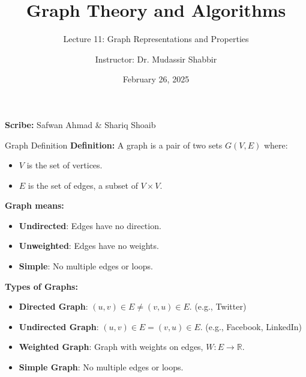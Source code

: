 \documentclass{beamer}
\title{Graph Theory and Algorithms}
\subtitle{Lecture 11: Graph Representations and Properties}
\author{Instructor: Dr. Mudassir Shabbir}
\institute{ITU}
\date{February 26, 2025}
\begin{document}
\begin{frame}
    \titlepage
    \vspace{1cm}
    \textbf{Scribe:} Safwan Ahmad \& Shariq Shoaib
\end{frame}

\begin{frame}{Graph Definition}
    \textbf{Definition:} A graph is a pair of two sets $G(V,E)$ where:
    \begin{itemize}
        \item $V$ is the set of vertices.
        \item $E$ is the set of edges, a subset of $V \times V$.
    \end{itemize}
    
    \textbf{Graph means:}
    \begin{itemize}
        \item \textbf{Undirected}: Edges have no direction.
        \item \textbf{Unweighted}: Edges have no weights.
        \item \textbf{Simple}: No multiple edges or loops.
    \end{itemize}

    \textbf{Types of Graphs:}
    \begin{itemize}
        \item \textbf{Directed Graph}: $(u,v) \in E \neq (v,u) \in E$. (e.g., Twitter)
        \item \textbf{Undirected Graph}: $(u,v) \in E = (v,u) \in E$. (e.g., Facebook, LinkedIn)
        \item \textbf{Weighted Graph}: Graph with weights on edges, $W: E \to \mathbb{R}$.
        \item \textbf{Simple Graph}: No multiple edges or loops.
    \end{itemize}
\end{frame}
\end{document}
